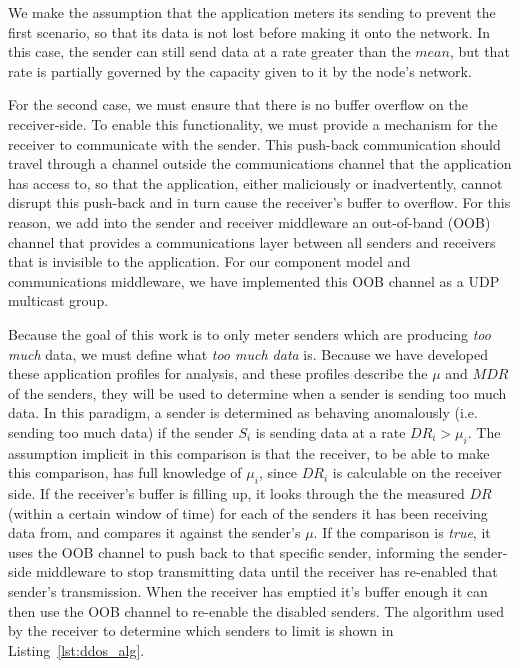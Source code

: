 We make the assumption that the application meters its sending to
prevent the first scenario, so that its data is not lost before making
it onto the network.  In this case, the sender can still send data at
a rate greater than the $mean$, but that rate is partially
governed by the capacity given to it by the node's network.

For the second case, we must ensure that there is no buffer overflow
on the receiver-side.  To enable this functionality, we must provide a
mechanism for the receiver to communicate with the sender.  This
push-back communication should travel through a channel outside the
communications channel that the application has access to, so that the
application, either maliciously or inadvertently, cannot disrupt this
push-back and in turn cause the receiver's buffer to overflow.  For
this reason, we add into the sender and receiver middleware an
out-of-band (OOB) channel that provides a communications layer between
all senders and receivers that is invisible to the application.  For
our component model and communications middleware, we have implemented
this OOB channel as a UDP multicast group.

Because the goal of this work is to only meter senders which are
producing \emph{too much} data, we must define what \emph{too much
  data} is.  Because we have developed these application profiles for
analysis, and these profiles describe the $\mu$ and $MDR$ of the
senders, they will be used to determine when a sender is sending too
much data.  In this paradigm, a sender is determined as behaving
anomalously (i.e. sending too much data) if the sender $S_i$ is
sending data at a rate $DR_i > \mu_i$.  The assumption implicit in
this comparison is that the receiver, to be able to make this
comparison, has full knowledge of $\mu_i$, since $DR_i$ is calculable
on the receiver side.  If the receiver's buffer is filling up, it
looks through the the measured $DR$ (within a certain window of time)
for each of the senders it has been receiving data from, and compares
it against the sender's $\mu$.  If the comparison is \emph{true}, it
uses the OOB channel to push back to that specific sender, informing
the sender-side middleware to stop transmitting data until the
receiver has re-enabled that sender's transmission.  When the receiver
has emptied it's buffer enough it can then use the OOB channel to
re-enable the disabled senders.  The algorithm used by the receiver to
determine which senders to limit is shown in Listing~\ref{lst:ddos_alg}.


